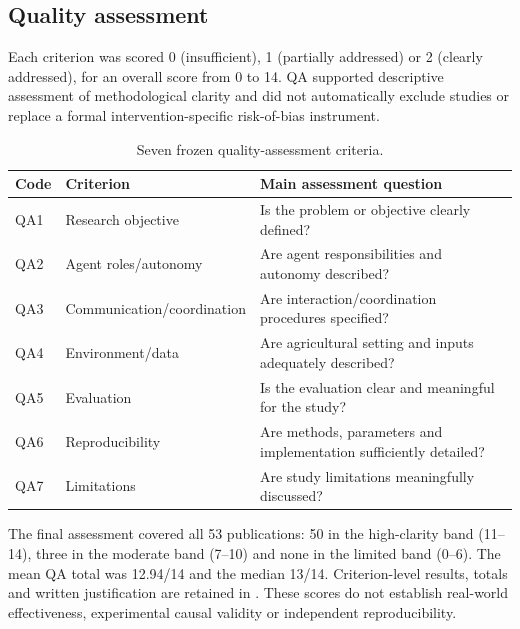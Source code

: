 \subsection{Quality assessment}
Each criterion was scored 0 (insufficient), 1 (partially addressed) or 2 (clearly addressed), for an overall score from 0 to 14. QA supported descriptive assessment of methodological clarity and did not automatically exclude studies or replace a formal intervention-specific risk-of-bias instrument.
\begin{table}[htbp]\centering\small
\caption{Seven frozen quality-assessment criteria.}\label{tab:app_qa_criteria}
\begin{tabularx}{\textwidth}{@{}llX@{}}\toprule Code & Criterion & Main assessment question \\\midrule
QA1 & Research objective & Is the problem or objective clearly defined?\\
QA2 & Agent roles/autonomy & Are agent responsibilities and autonomy described?\\
QA3 & Communication/coordination & Are interaction/coordination procedures specified?\\
QA4 & Environment/data & Are agricultural setting and inputs adequately described?\\
QA5 & Evaluation & Is the evaluation clear and meaningful for the study?\\
QA6 & Reproducibility & Are methods, parameters and implementation sufficiently detailed?\\
QA7 & Limitations & Are study limitations meaningfully discussed?\\
\bottomrule\end{tabularx}\end{table}
The final assessment covered all 53 publications: 50 in the high-clarity band (11--14), three in the moderate band (7--10) and none in the limited band (0--6). The mean QA total was 12.94/14 and the median 13/14. Criterion-level results, totals and written justification are retained in . These scores do not establish real-world effectiveness, experimental causal validity or independent reproducibility.

